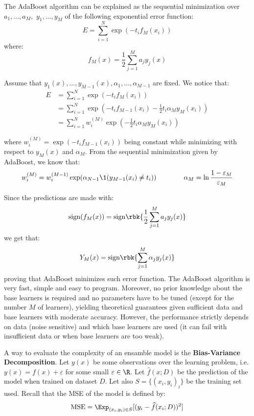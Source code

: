 \documentclass[a4paper, 12pt]{report}
\begin{document}
    \newpage

    The AdaBoost algorithm can be explained as the sequential minimization over $a_1, \ldots, a_M,$ $y_1, \ldots, y_M$ of the following exponential error function:
    \[E = \sum_{i = 1}^N \exp(-t_i f_M(x_i))\]
    where:
    \[f_M(x) = \frac{1}{2} \sum_{j = 1}^M a_j y_j(x)\]

    Assume that $y_1(x), \ldots, y_{M-1}(x), \alpha_1, \ldots, \alpha_{M-1}$ are fixed. We notice that:
    \[\begin{split}
        E &= \sum_{i = 1}^N \exp(-t_i f_M(x_i)) \\
        &= \sum_{i = 1}^N \exp(-t_i f_{M-1}(x_i) - \frac{1}{2} t_i \alpha_M y_M(x_i)) \\
        &= \sum_{i = 1}^N w_i^{(M)} \exp(-\frac{1}{2} t_i \alpha_M y_M(x_i))
    \end{split}\]

    where $w_i^{(M)} = \exp(-t_i f_{M-1}(x_i))$ being constant while minimizing with respect to $y_M(x)$ and $\alpha_M$. From the sequential minimization given by AdaBoost, we know that:
    \[w_i^{(M)} = w_i^{(M-1)} \exp(\alpha_{N-1} \1(y_{M-1}(x_i) \neq t_i)) \qquad\qquad \alpha_{M} = \ln \frac{1-\varepsilon_{M}}{\varepsilon_M}\]

    Since the predictions are made with:
    \[\mathrm{sign}(f_M(x)) = \mathrm{sign} \rbk{\frac{1}{2} \sum_{j = 1}^M a_j y_j(x)}\]
    we get that:
    \[Y_M(x) = \mathrm{sign}\rbk{\sum_{j = 1}^M \alpha_j y_j(x)}\]
    proving that AdaBoost minimizes such error function. The AdaBoost algorithm is very fast, simple and easy to program. Moreover, no prior knowledge about the base learners is required and no parameters have to be tuned (except for the number $M$ of learners), yielding theoretical guarantees given sufficient data and base learners with moderate accuracy. However, the performance strictly depends on data (noise sensitive) and which base learners are used (it can fail with insufficient data or when base learners are too weak).

    A way to evaluate the complexity of an ensamble model is the \textbf{Bias-Variance Decomposition}. Let $y(x)$ be some observations over the learning problem, i.e. $y(x) = f(x) + \varepsilon$ for some small $\varepsilon \in \R$. Let $\widehat{f}(x; D)$ be the prediction of the model when trained on dataset $D$. Let also $S = \{(x_i, y_i)_{i}\}$ be the training set used. Recall that the MSE of the model is defined by:
    \[\mathrm{MSE} = \Exp_{(x_i, y_i) \in S}[(y_i - \widehat{f}(x_i; D))^2]\]
    
\end{document}
